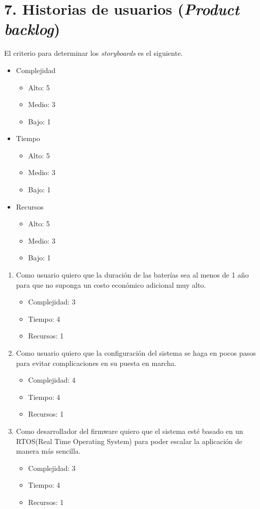 \documentclass[
11pt, %
]{plan}
\begin{document}
\section{7. Historias de usuarios (\textit{Product backlog})}
\label{sec:backlog}

El criterio para determinar los \textit{storyboards} es el siguiente.

\begin{itemize}
	\item Complejidad
	\begin{itemize}
		\item Alto: 5
		\item Medio: 3
		\item Bajo: 1
	\end{itemize}
	\item Tiempo
	\begin{itemize}
		\item Alto: 5
		\item Medio: 3
		\item Bajo: 1
	\end{itemize}
	\item Recursos
	\begin{itemize}
		\item Alto: 5
		\item Medio: 3
		\item Bajo: 1
	\end{itemize}
\end{itemize}

\begin{enumerate}
	\item Como usuario quiero que la duración de las baterías sea al menos de 1 año para que no suponga un costo económico adicional muy alto.
	\begin{itemize}
		\item Complejidad: 3
		\item Tiempo: 4
		\item Recursos: 1
	\end{itemize}
	\item Como usuario quiero que la configuración del sistema se haga en pocos pasos para evitar complicaciones en su puesta en marcha.
	\begin{itemize}
		\item Complejidad: 4
		\item Tiempo: 4
		\item Recursos: 1
	\end{itemize}
	\item Como desarrollador del firmware quiero que el sistema esté basado en un RTOS(Real Time Operating System) para poder escalar la aplicación de manera más sencilla.
	\begin{itemize}
		\item Complejidad: 3
		\item Tiempo: 4
		\item Recursos: 1
	\end{itemize}
\end{enumerate}
\end{document}
